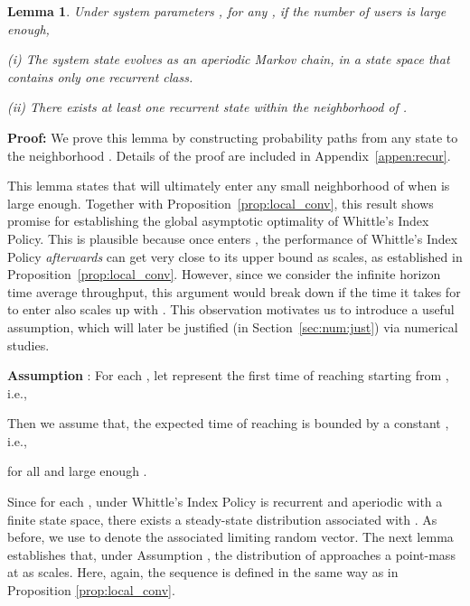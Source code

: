 \documentclass[11pt,twocolumn]{IEEEtran}
\newtheorem{lemma}{Lemma}
\begin{document}
\begin{lemma}
\label{lemma:recur}
Under system parameters , for any , if the number of users  is large enough, 

\noindent(i) The system state  evolves as an aperiodic
Markov chain, in a state space that contains only one recurrent
class.

\noindent(ii) There exists at least one recurrent state within the
 neighborhood  of .
\end{lemma}

\noindent \textbf{Proof:}  We prove this lemma by constructing probability paths from any
state to the neighborhood . Details of the proof are included in Appendix~\ref{appen:recur}. 
\vspace{4pt}



This lemma states that  will ultimately enter any
small neighborhood of  when
 is large enough. Together with
Proposition~\ref{prop:local_conv}, this result shows promise for
establishing the global asymptotic optimality of Whittle's Index
Policy. This is plausible because once  enters
, the
performance of Whittle's Index Policy \emph{afterwards} can
get very close to its upper bound as  scales, as established in
Proposition~\ref{prop:local_conv}. However, since we consider the infinite horizon time average throughput, this argument would break down if the time it takes for  to enter  also scales
up with . This observation
motivates us to introduce a useful assumption, which will later be justified
(in Section~\ref{sec:num:just}) via numerical studies.

\vspace{5pt}



\noindent \textbf{Assumption }: For each , let
 represent the first time of reaching
 starting
from , i.e.,

Then we assume that, the expected time of reaching
 is
bounded by a constant , i.e.,

for all  and large enough .

\vspace{7pt}

Since for each ,  under Whittle's Index Policy is
recurrent and aperiodic with a finite state space, there exists a
steady-state distribution associated with . As before,
we use  to denote the associated limiting random
vector. The next lemma establishes that, under Assumption , the
distribution of  approaches a point-mass at
 as  scales. Here, again,
the sequence  is defined in the same way as in
Proposition \ref{prop:local_conv}.
\end{document}
